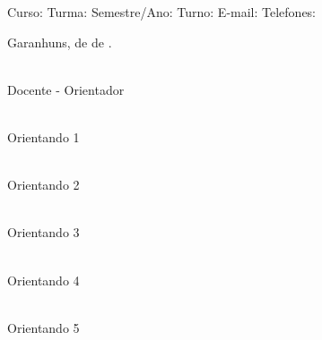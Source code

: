 \documentclass[12pt, a4paper]{article}
\begin{document}
\vspace{0.5cm}

 \underline{\hspace{14.5cm}}
Curso: \underline{\hspace{14.5cm}}
Turma: \underline{\hspace{3cm}} Semestre/Ano: \underline{\hspace{3cm}} Turno:
\underline{\hspace{3.5cm}}
E-mail: \underline{\hspace{14.5cm}}
Telefones: \underline{\hspace{14cm}}

\vspace{1cm}

\begin{center}
  Garanhuns, \underline{\hspace{1cm}} de \underline{\hspace{3cm}} de
  \underline{\hspace{1.5cm}}.
\end{center}

\vspace{1cm}

\begin{center}
  \underline{\hspace{7cm}} \\
  Docente - Orientador
\end{center}

\vspace{0.5cm}

\begin{center}
  \underline{\hspace{7cm}} \\
  Orientando 1
\end{center}

\vspace{0.5cm}

\begin{center}
  \underline{\hspace{7cm}} \\
  Orientando 2
\end{center}

\vspace{0.5cm}

\begin{center}
  \underline{\hspace{7cm}} \\
  Orientando 3
\end{center}

\vspace{0.5cm}

\begin{center}
  \underline{\hspace{7cm}} \\
  Orientando 4
\end{center}

\vspace{0.5cm}

\begin{center}
  \underline{\hspace{7cm}} \\
  Orientando 5
\end{center}
\end{document}
